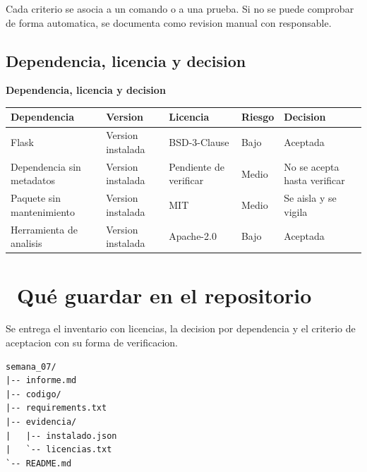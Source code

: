 \documentclass[11pt,a4paper]{article}
\newcommand{\iconotexto}[2]{\textcolor{cyanNeon}{\faIcon{#1}}~#2}
\begin{document}
Cada criterio se asocia a un comando o a una prueba. Si no se puede comprobar de forma automatica, se documenta como revision manual con responsable.

\subsection{Dependencia, licencia y decision}

\begin{center}
\begin{minipage}{\linewidth}
\centering
{\footnotesize
\textbf{Dependencia, licencia y decision}\par\smallskip
\begin{tabular}{@{}>{\raggedright\arraybackslash}p{3.00cm}>{\raggedright\arraybackslash}p{1.80cm}>{\raggedright\arraybackslash}p{3.00cm}>{\raggedright\arraybackslash}p{2.40cm}>{\raggedright\arraybackslash}p{3.60cm}@{}}
\toprule
\textbf{Dependencia} & \textbf{Version} & \textbf{Licencia} & \textbf{Riesgo} & \textbf{Decision} \\
\midrule
Flask & Version instalada & BSD-3-Clause & Bajo & Aceptada \\
Dependencia sin metadatos & Version instalada & Pendiente de verificar & Medio & No se acepta hasta verificar \\
Paquete sin mantenimiento & Version instalada & MIT & Medio & Se aisla y se vigila \\
Herramienta de analisis & Version instalada & Apache-2.0 & Bajo & Aceptada \\
\bottomrule
\end{tabular}
}
\par{}
\end{minipage}
\end{center}

\section{\iconotexto{box-open}{Qué guardar en el repositorio}}

Se entrega el inventario con licencias, la decision por dependencia y el criterio de aceptacion con su forma de verificacion.

\begin{lstlisting}[style=estiloCodigo]
semana_07/
|-- informe.md
|-- codigo/
|-- requirements.txt
|-- evidencia/
|   |-- instalado.json
|   `-- licencias.txt
`-- README.md
\end{lstlisting}
\end{document}
